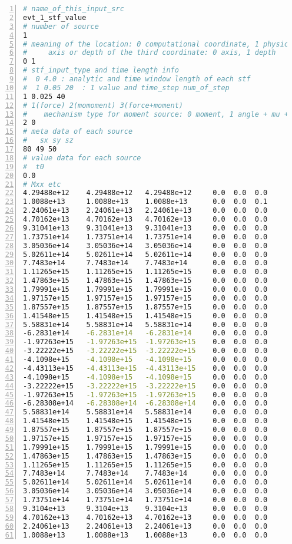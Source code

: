 \begin{lstlisting}[language=bash, caption=Source input file using discrete STF, label={lst_stf_value},
   numbers=left, numbersep=5pt,numberstyle=\tiny\color{codegray}, commentstyle=\color{codegreen},
   frame=single]
# name_of_this_input_src
evt_1_stf_value
# number of source
1
# meaning of the location: 0 computational coordinate, 1 physical coordinate
#     axis or depth of the third coordinate: 0 axis, 1 depth
0 1
# stf_input_type and time length info
#  0 4.0 : analytic and time window length of each stf
#  1 0.05 20  : 1 value and time_step num_of_step
1 0.025 40
# 1(force) 2(momoment) 3(force+moment)
#    mechanism type for moment source: 0 moment, 1 angle + mu + D + A
2 0
# meta data of each source
#   sx sy sz
80 49 50
# value data for each source
#  t0
0.0 
# Mxx etc
4.29488e+12    4.29488e+12   4.29488e+12     0.0  0.0  0.0
1.0088e+13     1.0088e+13    1.0088e+13      0.0  0.0  0.1
2.24061e+13    2.24061e+13   2.24061e+13     0.0  0.0  0.0
4.70162e+13    4.70162e+13   4.70162e+13     0.0  0.0  0.0
9.31041e+13    9.31041e+13   9.31041e+13     0.0  0.0  0.0
1.73751e+14    1.73751e+14   1.73751e+14     0.0  0.0  0.0
3.05036e+14    3.05036e+14   3.05036e+14     0.0  0.0  0.0
5.02611e+14    5.02611e+14   5.02611e+14     0.0  0.0  0.0
7.7483e+14     7.7483e+14    7.7483e+14      0.0  0.0  0.0
1.11265e+15    1.11265e+15   1.11265e+15     0.0  0.0  0.0
1.47863e+15    1.47863e+15   1.47863e+15     0.0  0.0  0.0
1.79991e+15    1.79991e+15   1.79991e+15     0.0  0.0  0.0
1.97157e+15    1.97157e+15   1.97157e+15     0.0  0.0  0.0
1.87557e+15    1.87557e+15   1.87557e+15     0.0  0.0  0.0
1.41548e+15    1.41548e+15   1.41548e+15     0.0  0.0  0.0
5.58831e+14    5.58831e+14   5.58831e+14     0.0  0.0  0.0
-6.2831e+14    -6.2831e+14   -6.2831e+14     0.0  0.0  0.0
-1.97263e+15   -1.97263e+15  -1.97263e+15    0.0  0.0  0.0
-3.22222e+15   -3.22222e+15  -3.22222e+15    0.0  0.0  0.0
-4.1098e+15    -4.1098e+15   -4.1098e+15     0.0  0.0  0.0
-4.43113e+15   -4.43113e+15  -4.43113e+15    0.0  0.0  0.0
-4.1098e+15    -4.1098e+15   -4.1098e+15     0.0  0.0  0.0
-3.22222e+15   -3.22222e+15  -3.22222e+15    0.0  0.0  0.0
-1.97263e+15   -1.97263e+15  -1.97263e+15    0.0  0.0  0.0
-6.28308e+14   -6.28308e+14  -6.28308e+14    0.0  0.0  0.0
5.58831e+14    5.58831e+14   5.58831e+14     0.0  0.0  0.0
1.41548e+15    1.41548e+15   1.41548e+15     0.0  0.0  0.0
1.87557e+15    1.87557e+15   1.87557e+15     0.0  0.0  0.0
1.97157e+15    1.97157e+15   1.97157e+15     0.0  0.0  0.0
1.79991e+15    1.79991e+15   1.79991e+15     0.0  0.0  0.0
1.47863e+15    1.47863e+15   1.47863e+15     0.0  0.0  0.0
1.11265e+15    1.11265e+15   1.11265e+15     0.0  0.0  0.0
7.7483e+14     7.7483e+14    7.7483e+14      0.0  0.0  0.0
5.02611e+14    5.02611e+14   5.02611e+14     0.0  0.0  0.0
3.05036e+14    3.05036e+14   3.05036e+14     0.0  0.0  0.0
1.73751e+14    1.73751e+14   1.73751e+14     0.0  0.0  0.0
9.3104e+13     9.3104e+13    9.3104e+13      0.0  0.0  0.0
4.70162e+13    4.70162e+13   4.70162e+13     0.0  0.0  0.0
2.24061e+13    2.24061e+13   2.24061e+13     0.0  0.0  0.0
1.0088e+13     1.0088e+13    1.0088e+13      0.0  0.0  0.0
\end{lstlisting}
